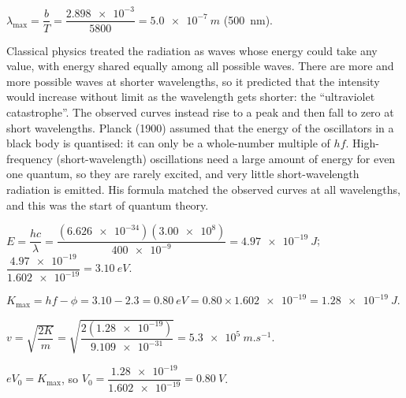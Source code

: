 \documentclass[12pt]{article}
\begin{document}
\ansq
{}
\begin{crit}
\end{crit}
\sample
$\lambda_\mathrm{max} = \dfrac{b}{T} = \dfrac{\num{2.898e-3}}{5800} = \qty{5.0e-7}{m}$ (\qty{500}{nm}).
\begin{crit}
\end{crit}
\sample
Classical physics treated the radiation as waves whose energy could take any value, with energy shared
equally among all possible waves. There are more and more possible waves at shorter wavelengths, so it
predicted that the intensity would increase without limit as the wavelength gets shorter: the
``ultraviolet catastrophe''. The observed curves instead rise to a peak and then fall to zero at short
wavelengths. Planck (1900) assumed that the energy of the oscillators in a black body is quantised: it can
only be a whole-number multiple of $hf$. High-frequency (short-wavelength) oscillations need a large
amount of energy for even one quantum, so they are rarely excited, and very little short-wavelength
radiation is emitted. His formula matched the observed curves at all wavelengths, and this was the start
of quantum theory.

\ansq
{}
\begin{crit}
\end{crit}
\sample
$E = \dfrac{hc}{\lambda} = \dfrac{(\num{6.626e-34})(\num{3.00e8})}{\num{400e-9}} = \qty{4.97e-19}{J}$;
\quad $\dfrac{\num{4.97e-19}}{\num{1.602e-19}} = \qty{3.10}{eV}$.
\begin{crit}
\end{crit}
\sample
$K_\mathrm{max} = hf - \phi = 3.10 - 2.3 = \qty{0.80}{eV} = 0.80 \times \num{1.602e-19} = \qty{1.28e-19}{J}$.
\begin{crit}
\end{crit}
\sample
$v = \sqrt{\dfrac{2K}{m}} = \sqrt{\dfrac{2(\num{1.28e-19})}{\num{9.109e-31}}} = \qty{5.3e5}{m.s^{-1}}$.
\begin{crit}
\end{crit}
\sample
$eV_0 = K_\mathrm{max}$, so $V_0 = \dfrac{\num{1.28e-19}}{\num{1.602e-19}} = \qty{0.80}{V}$.
\end{document}
